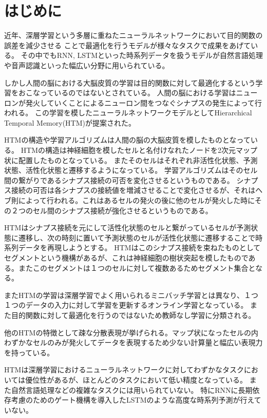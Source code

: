 \chapter{はじめに}
近年、深層学習という多層に重ねたニューラルネットワークにおいて目的関数の誤差を減少させる
ことで最適化を行うモデルが様々なタスクで成果をあげている。
その中でもRNN, LSTMといった時系列データを扱うモデルが自然言語処理や音声認識といった幅広い分野に用いられている。

しかし人間の脳における大脳皮質の学習は目的関数に対して最適化するという学習をおこなっているのではないとされている。\cite{neurons}
人間の脳における学習はニューロンが発火していくことによるニューロン間をつなぐシナプスの発生によって行われる。
この学習を模したニューラルネットワークモデルとしてHierarchical Temporal Memory(HTM)が提案された。\cite{htm}

HTMの構造や学習アルゴリズムは人間の脳の大脳皮質を模したものとなっている。
HTMの構造は神経細胞を模したセルと名付けなれたノードを2次元マップ状に配置したものとなっている。
またそのセルはそれぞれ非活性化状態、予測状態、活性化状態と遷移するようになっている。
学習アルゴリズムはそのセル間の繋がりであるシナプス接続の可否を変化させるというものである。
シナプス接続の可否は各シナプスの接続値を増減させることで変化させるが、それはヘブ則によって行われる。これはあるセルの発火の後に他のセルが発火した時にその２つのセル間のシナプス接続が強化させるというものである。

HTMはシナプス接続を元にして活性化状態のセルと繋がっているセルが予測状態に遷移し、次の時刻に置いて予測状態のセルが活性化状態に遷移することで時系列データを再現しようとする。
HTMはこのシナプス接続を束ねたものとしてセグメントという機構があるが、これは神経細胞の樹状突起を模したものである。またこのセグメントは１つのセルに対して複数あるためセグメント集合となる。

またHTMの学習は深層学習でよく用いられるミニバッチ学習とは異なり、１つ１つのデータの入力に対して学習を更新するオンライン学習となっている。
また目的関数に対して最適化を行うのではないため教師なし学習に分類される。

他のHTMの特徴として疎な分散表現が挙げられる。マップ状になったセルの内わずかなセルのみが発火してデータを表現するため少ない計算量と幅広い表現力を持っている。

HTMは深層学習におけるニューラルネットワークに対してわずかなタスクにおいては優位性があるが、ほとんどのタスクにおいて低い精度となっている。
また自然言語処理などの複雑なタスクには用いられていない。
特にRNNに長期依存考慮のためのゲート機構を導入したLSTMのような高度な時系列予測が行えていない。

